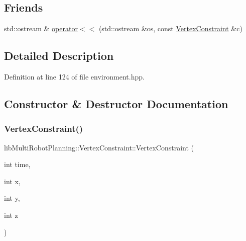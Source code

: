 \subsection*{Friends}
\begin{DoxyCompactItemize}
\item 
std\+::ostream \& \hyperlink{structlib_multi_robot_planning_1_1_vertex_constraint_a673f5d8fdc4898875720dddfd6c80e68}{operator$<$$<$} (std\+::ostream \&os, const \hyperlink{structlib_multi_robot_planning_1_1_vertex_constraint}{Vertex\+Constraint} \&c)
\end{DoxyCompactItemize}


\subsection{Detailed Description}


Definition at line 124 of file environment.\+hpp.



\subsection{Constructor \& Destructor Documentation}
\mbox{\label{structlib_multi_robot_planning_1_1_vertex_constraint_a00ed34edc97e7d319cb82895a674aca0}} 
\subsubsection{\texorpdfstring{Vertex\+Constraint()}{VertexConstraint()}}
{\footnotesize\ttfamily lib\+Multi\+Robot\+Planning\+::\+Vertex\+Constraint\+::\+Vertex\+Constraint (\begin{DoxyParamCaption}\item[{int}]{time,  }\item[{int}]{x,  }\item[{int}]{y,  }\item[{int}]{z }\end{DoxyParamCaption})\hspace{0.3cm}{\ttfamily [inline]}}



